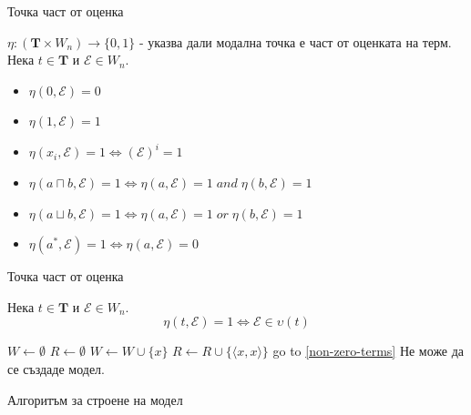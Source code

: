 \documentclass[14pt, aspectratio=169]{beamer}
\renewcommand\thealgorithm{}
\newcommand\E{\mathcal{E}}
\newcommand\Tb{\mathbf{T}}
\newcommand{\pair}[2]{ \langle #1, #2 \rangle }
\newcommand{\pairXX}{ \pair{x}{x} }
\begin{document}
\begin{frame}{Точка част от оценка}
		\begin{definition}[$\eta$]
			$\eta: (\Tb \times W_n) \rightarrow \{0, 1 \}$ - указва дали модална точка е част от оценката на терм. Нека $t \in \Tb$ и $\E \in W_n$.
			\begin{itemize}
				\item $\eta(0, \E) = 0$
				\item $\eta(1, \E) = 1$
				\item $\eta(x_i, \E) = 1 \iff (\E)^i = 1$
				\item $\eta(a \sqcap b, \E) = 1 \iff \eta(a, \E) = 1 \; and \; \eta(b, \E) = 1$
				\item $\eta(a \sqcup b, \E) = 1 \iff \eta(a, \E) = 1 \; or \; \eta(b, \E) = 1$
				\item $\eta(a^*, \E) = 1 \iff \eta(a, \E) = 0$
			\end{itemize}
		\end{definition}
\end{frame}

\begin{frame}{Точка част от оценка}
	\begin{lemma}
		Нека $t \in \Tb$ и $\E \in W_n$.
		\begin{equation*}
			\eta(t, \E) = 1 \iff \E \in \upsilon(t)
		\end{equation*}
	\end{lemma}
\end{frame}

\begin{frame}
	\begin{algorithm}[H]
	\renewcommand\thealgorithm{} %
	\begin{algorithmic}[1] %
		\STATE $W \gets \emptyset$
		\STATE $R \gets \emptyset$
		 \label{non-zero-terms}
			\FOR{$\E \in W^v$}
				\IF{$\eta(d, \E_n) = 1$}
					\STATE $W \gets W \cup \{ x \}$
					\STATE $R \gets R \cup \{ \pairXX \}$
					\STATE go to \ref{non-zero-terms}
				\ENDIF
			\ENDFOR
			\STATE Не може да се създаде модел.
		\ENDFOR
	\end{algorithmic}

	\caption{Алгоритъм за строене на модел}
	\label{alg:seq}
	\end{algorithm}
\end{frame}
\end{document}
